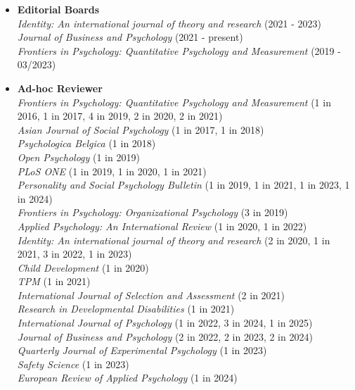 \documentclass[hidelinks, letterpaper,10pt]{article} %
\begin{document}
\begin{itemize} 
	\setlength{\topsep}{0pt}%
	\setlength{\leftmargin}{0.1in}%
	
\item {\textbf{\large{Editorial Boards}}}\\
	\textit{Identity: An international journal of theory and research} (2021 - 2023)\\
	\textit{Journal of Business and Psychology} (2021 - present)\\
	\textit{Frontiers in Psychology: Quantitative Psychology and Measurement} (2019 - 03/2023)\\
	
\item {\textbf{\large{Ad-hoc Reviewer}}}\\
	\textit{Frontiers in Psychology: Quantitative Psychology and Measurement} (1 in 2016, 1 in 2017, 4 in 2019, 2 in 2020, 2 in 2021) \\
    \textit{Asian Journal of Social Psychology} (1 in 2017, 1 in 2018) \\
    \textit{Psychologica Belgica} (1 in 2018) \\
	\textit{Open Psychology} (1 in 2019) \\
	\textit{PLoS ONE} (1 in 2019, 1 in 2020, 1 in 2021) \\
	\textit{Personality and Social Psychology Bulletin} (1 in 2019, 1 in 2021, 1 in 2023, 1 in 2024) \\
	\textit{Frontiers in Psychology: Organizational Psychology} (3 in 2019) \\
	\textit{Applied Psychology: An International Review} (1 in 2020, 1 in 2022) \\
	\textit{Identity: An international journal of theory and research} (2 in 2020, 1 in 2021, 3 in 2022, 1 in 2023) \\
	\textit{Child Development} (1 in 2020) \\
	\textit{TPM} (1 in 2021) \\
	\textit{International Journal of Selection and Assessment} (2 in 2021) \\
	\textit{Research in Developmental Disabilities} (1 in 2021) \\
	\textit{International Journal of Psychology} (1 in 2022, 3 in 2024, 1 in 2025) \\
	\textit{Journal of Business and Psychology} (2 in 2022, 2 in 2023, 2 in 2024) \\
    \textit{Quarterly Journal of Experimental Psychology} (1 in 2023) \\
    \textit{Safety Science} (1 in 2023) \\
    \textit{European Review of Applied Psychology} (1 in 2024)


\end{itemize}
\end{document}

